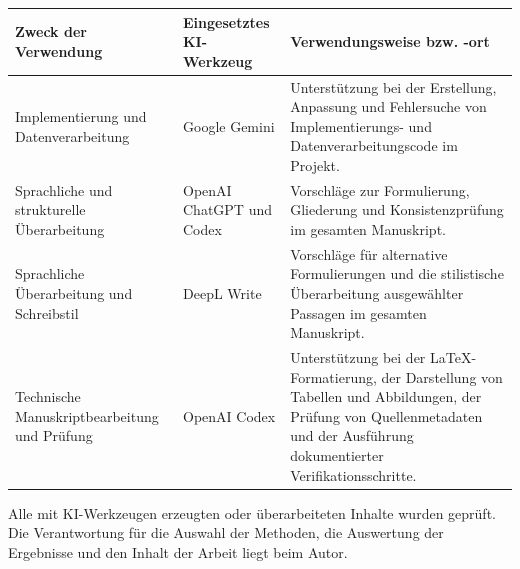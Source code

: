 \vspace{1em}
{\small
\renewcommand{\arraystretch}{1.35}
\begin{tabularx}{\textwidth}{@{}>{\raggedright\arraybackslash}p{}>{\raggedright\arraybackslash}p{}>{\raggedright\arraybackslash}X@{}}
\toprule
\textbf{Zweck der Verwendung} & \textbf{Eingesetztes KI-Werkzeug} & \textbf{Verwendungsweise bzw. -ort} \\
\midrule
Implementierung und Datenverarbeitung
& Google Gemini
& Unterstützung bei der Erstellung, Anpassung und Fehlersuche von Implementierungs- und Datenverarbeitungscode im Projekt. \\
\addlinespace
Sprachliche und strukturelle Überarbeitung
& OpenAI ChatGPT und Codex
& Vorschläge zur Formulierung, Gliederung und Konsistenzprüfung im gesamten Manuskript. \\
\addlinespace
Sprachliche Überarbeitung und Schreibstil
& DeepL Write
& Vorschläge für alternative Formulierungen und die stilistische Überarbeitung ausgewählter Passagen im gesamten Manuskript. \\
\addlinespace
Technische Manuskriptbearbeitung und Prüfung
& OpenAI Codex
& Unterstützung bei der LaTeX-Formatierung, der Darstellung von Tabellen und Abbildungen, der Prüfung von Quellenmetadaten und der Ausführung dokumentierter Verifikationsschritte. \\
\bottomrule
\end{tabularx}
}

\vspace{1.5em}
\noindent
Alle mit KI-Werkzeugen erzeugten oder überarbeiteten Inhalte wurden geprüft. Die Verantwortung für die Auswahl der Methoden, die Auswertung der Ergebnisse und den Inhalt der Arbeit liegt beim Autor.
